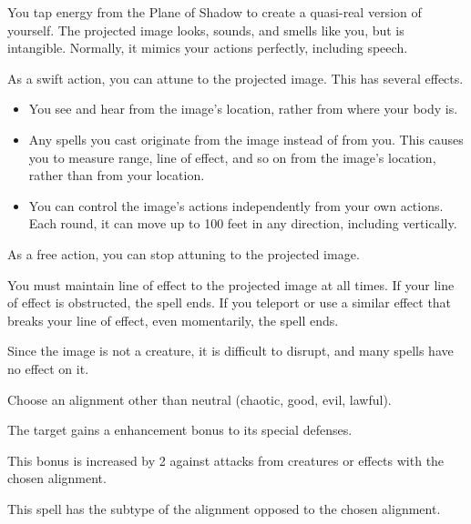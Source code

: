 \begin{spellheader}
    \spellrng{\rngmed}
    \spelldur{\durmed \dismissable}
\end{spellheader}
\begin{spelleffects}
    \spelleffect You tap energy from the Plane of Shadow to create a quasi-real version of yourself. The projected image looks, sounds, and smells like you, but is intangible. Normally, it mimics your actions perfectly, including speech.
    \par As a swift action, you can attune to the projected image. This has several effects.
    \begin{itemize}
        \item You see and hear from the image's location, rather from where your body is.
        \item Any spells you cast originate from the image instead of from you. This causes you to measure range, line of effect, and so on from the image's location, rather than from your location.
        \item You can control the image's actions independently from your own actions. Each round, it can move up to 100 feet in any direction, including vertically.
    \end{itemize}

    As a free action, you can stop attuning to the projected image.

\end{spelleffects}
\begin{spellfooter}
    \spellnotes You must maintain line of effect to the projected image at all times. If your line of effect is obstructed, the spell ends. If you teleport or use a similar effect that breaks your line of effect, even momentarily, the spell ends.

    Since the image is not a creature, it is difficult to disrupt, and many spells have no effect on it.
\end{spellfooter}

\begin{spellheader}
    \spellrng{\rngclose}
    \spelldur{\durshort \dismissable}
    \spellspecial Choose an alignment other than neutral (chaotic, good, evil, lawful).
\end{spellheader}
\begin{spelleffects}
    \spelleffect The target gains a  enhancement bonus to its special defenses. \spellbonusscalingdescription

    This bonus is increased by 2 against attacks from creatures or effects with the chosen alignment.
\end{spelleffects}
\begin{spellfooter}
    \spellnotes This spell has the subtype of the alignment opposed to the chosen alignment.
\end{spellfooter}


